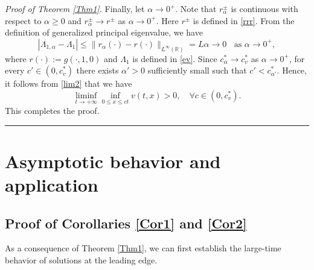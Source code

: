 \documentclass[10pt]{article}
\numberwithin{equation}{section}
\newcommand{\R}{\mathbb{R}}
\newenvironment{proof}[1][Proof]{\noindent\textit{#1.} }{\hfill \rule{0.5em}{0.5em}}
\begin{document}
\begin{proof}[Proof of Theorem \ref{Thm1}]
\vspace{1em}
Finally, let $\alpha\to 0^+$. Note that  $r_\alpha^\pm$ is continuous with respect to $\alpha \geq 0$ and $r_\alpha^\pm \to r^\pm$ as $\alpha \to 0^+$.  Here $r^{\pm}$ is defined in \eqref{rrr}.    From the definition of generalized principal eigenvalue, we have 
 $$   |\Lambda_{1, \alpha} - \Lambda_{1}  |  \leq \| r_{\alpha}(\cdot) -r(\cdot) \|_{L^\infty(\R)} =L \alpha \to 0   \;\;   \text{ as } \alpha \to 0^+, $$
where $r(\cdot):= g(\cdot, 1,0)$ and $\Lambda_1$ is defined in \eqref{ev}.
Since \(c_\alpha^*\to c_v^*\) as \(\alpha\to0^+\), for every \(c'\in(0,c_v^*)\) there exists \(\alpha'>0\) sufficiently small such that \(c'<c_{\alpha'}^*\).
   Hence, it follows from \eqref{lim2}  that we have  
\begin{equation*}
\liminf_{t\to +\infty} \inf_{ 0 \leq x\leq c t} v(t, x) >0,  \quad \forall c\in (0, c^*_v).
\end{equation*}
This completes the proof.
\end{proof}


\section{Asymptotic behavior and application}
\subsection{Proof of Corollaries \ref{Cor1} and \ref{Cor2}}
As a consequence of Theorem \ref{Thm1}, we can first establish the large-time behavior of solutions at the leading edge.
\end{document}
